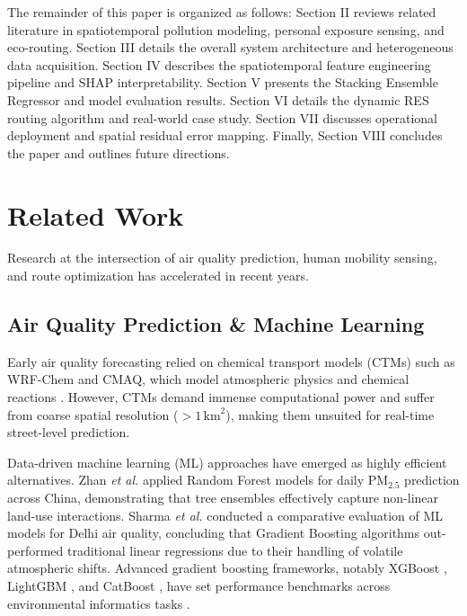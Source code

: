 \documentclass[journal]{IEEEtran}
\begin{document}
The remainder of this paper is organized as follows: Section II reviews related literature in spatiotemporal pollution modeling, personal exposure sensing, and eco-routing. Section III details the overall system architecture and heterogeneous data acquisition. Section IV describes the spatiotemporal feature engineering pipeline and SHAP interpretability. Section V presents the Stacking Ensemble Regressor and model evaluation results. Section VI details the dynamic RES routing algorithm and real-world case study. Section VII discusses operational deployment and spatial residual error mapping. Finally, Section VIII concludes the paper and outlines future directions.

\section{Related Work}
Research at the intersection of air quality prediction, human mobility sensing, and route optimization has accelerated in recent years.

\subsection{Air Quality Prediction \& Machine Learning}
Early air quality forecasting relied on chemical transport models (CTMs) such as WRF-Chem and CMAQ, which model atmospheric physics and chemical reactions \cite{kumar2023}. However, CTMs demand immense computational power and suffer from coarse spatial resolution ($>1\,\text{km}^2$), making them unsuited for real-time street-level prediction. 

Data-driven machine learning (ML) approaches have emerged as highly efficient alternatives. Zhan \textit{et al.} \cite{zhan2017} applied Random Forest models for daily $\text{PM}_{2.5}$ prediction across China, demonstrating that tree ensembles effectively capture non-linear land-use interactions. Sharma \textit{et al.} \cite{sharma2020} conducted a comparative evaluation of ML models for Delhi air quality, concluding that Gradient Boosting algorithms out-performed traditional linear regressions due to their handling of volatile atmospheric shifts. Advanced gradient boosting frameworks, notably XGBoost \cite{chen2016}, LightGBM \cite{ke2017}, and CatBoost \cite{prokhorenkova2018}, have set performance benchmarks across environmental informatics tasks \cite{agrawal2020}.
\end{document}
